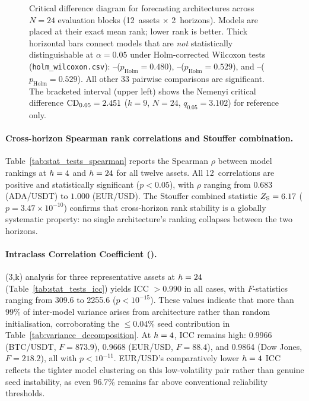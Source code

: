 \begin{figure}[htbp]
  \centering
  
  \caption{Critical difference diagram for \nmodels forecasting architectures
           across $N = 24$ evaluation blocks (12~assets $\times$ 2~horizons).
           Models are placed at their exact mean \rmse rank; lower rank is better.
           Thick horizontal bars connect models that are \emph{not} statistically
           distinguishable at $\alpha = 0.05$ under Holm-corrected Wilcoxon tests
           (\texttt{holm\_wilcoxon.csv}):
           \itransformer--\timexer ($p_\text{Holm} = 0.480$),
           \dlinear--\nhits ($p_\text{Holm} = 0.529$), and
           \timesnet--\autoformer ($p_\text{Holm} = 0.529$).
           All other 33 pairwise comparisons are significant.
           The bracketed interval (upper left) shows the Nemenyi critical
           difference $\mathrm{CD}_{0.05} = 2.451$ ($k = 9$, $N = 24$, $q_{0.05} = 3.102$)
           for reference only.}
  \label{fig:cd_diagram}
\end{figure}

\paragraph{Cross-horizon Spearman rank correlations and Stouffer combination.}
Table~\ref{tab:stat_tests_spearman} reports the Spearman $\rho$ between model rankings at $h=4$ and $h=24$ for all twelve assets.  All 12~correlations are positive and statistically significant ($p < 0.05$), with $\rho$ ranging from $0.683$ (ADA/USDT) to $1.000$ (EUR/USD).  The Stouffer combined statistic $Z_\mathrm{S} = 6.17$ ($p = 3.47 \times 10^{-10}$) confirms that cross-horizon rank stability is a globally systematic property: no single architecture's ranking collapses between the two horizons.

\paragraph{Intraclass Correlation Coefficient (\icc).}
\icc(3,k) analysis for three representative assets at $h=24$ (Table~\ref{tab:stat_tests_icc}) yields ICC $> 0.990$ in all cases, with $F$-statistics ranging from 309.6 to 2255.6 ($p < 10^{-15}$).  These values indicate that more than 99\% of inter-model variance arises from architecture rather than random initialisation, corroborating the $\leq 0.04\%$ seed contribution in Table~\ref{tab:variance_decomposition}.  At $h=4$, ICC remains high: 0.9966 (BTC/USDT, $F = 873.9$), 0.9668 (EUR/USD, $F = 88.4$), and 0.9864 (Dow Jones, $F = 218.2$), all with $p < 10^{-11}$.  EUR/USD's comparatively lower $h=4$ ICC reflects the tighter model clustering on this low-volatility pair rather than genuine seed instability, as even 96.7\% remains far above conventional reliability thresholds.

